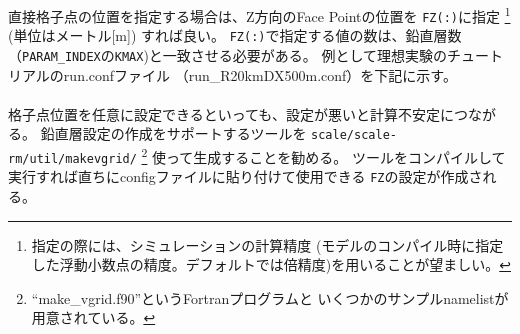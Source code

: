直接格子点の位置を指定する場合は、Z方向のFace Pointの位置を
\verb|FZ(:)|に指定
\footnote{指定の際には、シミュレーションの計算精度
(モデルのコンパイル時に指定した浮動小数点の精度。デフォルトでは倍精度)を用いることが望ましい。}
(単位はメートル[m]) すれば良い。
\verb|FZ(:)|で指定する値の数は、鉛直層数（\verb|PARAM_INDEX|の\verb|KMAX|)と一致させる必要がある。
例として理想実験のチュートリアルのrun.confファイル
（run\_R20kmDX500m.conf）を下記に示す。\\

\\


格子点位置を任意に設定できるといっても、設定が悪いと計算不安定につながる。
鉛直層設定の作成をサポートするツールを
\verb|scale/scale-rm/util/makevgrid/|
\footnote{``make\_vgrid.f90''というFortranプログラムと
いくつかのサンプルnamelistが用意されている。}
使って生成することを勧める。
ツールをコンパイルして実行すれば直ちにconfigファイルに貼り付けて使用できる
\verb|FZ|の設定が作成される。
